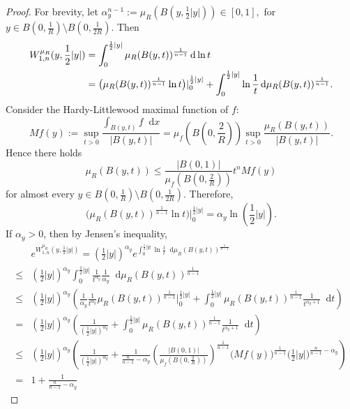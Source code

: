\documentclass[12pt]{amsart}
\theoremstyle{plain}
\theoremstyle{definition}
\theoremstyle{remark}     %
\numberwithin{equation}{section}
\newcommand{\dd}{\mathop{}\!\mathrm{d}}%
\newcommand{\dx}{\mathop{}\!\mathrm{d}x}
\begin{document}
\begin{proof}
    For brevity, let $\alpha_y^{n-1}:=\mu_R(B(y,\frac{1}{2}|y|))\in [0,1],$ for $y\in B(0,\frac{1}{R})\setminus B(0,\frac{1}{2R})$.  Then 
    \begin{align*}
        W_{1,n}^{\mu_R}(y,\frac{1}{2}|y|)
        &=\int_0^{\frac{1}{2}|y|}\mu_R(B(y,t))^{\frac{1}{n-1}}\dd \ln t \\ \notag
       & =\big(\mu_R(B(y,t))^{\frac{1}{n-1}}\ln t\big)|_0^{\frac{1}{2}|y|}
        +\int_0^{\frac{1}{2}|y|}\ln \frac{1}{t}\dd \mu_R(B(y,t))^{\frac{1}{n-1}}.
    \end{align*}
    Consider the Hardy-Littlewood maximal function of $f$:
    \[
        Mf(y):=
        \sup_{t>0}\frac{\int_{B(y,t)}f\dx}{|B(y,t)|}
        =\mu_f(B(0,\frac{2}{R}))\sup_{t>0}\frac{\mu_R(B(y,t))}{|B(y,t)|}.
    \]
    Hence there holds
    \[
        \mu_R(B(y,t))\leq \frac{|B(0,1)|}{\mu_f(B(0,\frac{2}{R}))}t^n Mf(y)
    \]
    for almost every $y \in B(0,\frac{1}{R})\setminus B(0,\frac{1}{2R})$. Therefore,
    \[
        \big(\mu_R(B(y,t))^{\frac{1}{n-1}}\ln t\big)|_0^{\frac{1}{2}|y|}
        =\alpha_y\ln(\frac{1}{2}|y|).
    \]
    If $\alpha_y>0$, then by Jensen's inequality,
    \begin{align*}
        & e^{W_{1,n}^{\mu_R}(y,\frac{1}{2}|y|)}
        =(\frac{1}{2}|y|)^{\alpha_y} 
        e^{\int_0^{\frac{1}{2}|y|} \ln \frac{1}{t}\dd \mu_R(B(y,t))^{\frac{1}{n-1}}
        }\\
        \leq &(\frac{1}{2}|y|)^{\alpha_y} \int_0^{\frac{1}{2}|y|}\frac{1}{t^{\alpha_y}}\frac{1}{\alpha_y}\dd \mu_R(B(y,t))^{\frac{1}{n-1}}\\
        \leq &(\frac{1}{2}|y|)^{\alpha_y}
        \left(
        \frac{1}{\alpha_y}\frac{1}{t^{\alpha_y}}\mu_R(B(y,t))^{\frac{1}{n-1}}\Big|_0^{\frac{1}{2}|y|}
        +\int_0^{\frac{1}{2}|y|}\mu_R(B(y,t))^{\frac{1}{n-1}}\frac{1}{t^{\alpha_y+1}}\dd t
        \right)\\
        =&(\frac{1}{2}|y|)^{\alpha_y}
        \left(
        \frac{1}{(\frac{1}{2}|y|)^{\alpha_y}}
        +\int_0^{\frac{1}{2}|y|}\mu_R(B(y,t))^{\frac{1}{n-1}}\frac{1}{t^{\alpha_y+1}}\dd t
        \right)\\
        \leq &(\frac{1}{2}|y|)^{\alpha_y}
        \left(
        \frac{1}{(\frac{1}{2}|y|)^{\alpha_y}}
        +\frac{1}{\frac{n}{n-1}-\alpha_y}
        \left(\frac{|B(0,1)|}{\mu_f(B(0,\frac{2}{R}))}\right)^{\frac{1}{n-1}}
        \Big(Mf(y)\Big)^{\frac{1}{n-1}}
        \Big(\frac{1}{2}|y|\Big)^{\frac{n}{n-1}-\alpha_y}
        \right)\\
        =&1
        +\frac{1}{\frac{n}{n-1}-\alpha_y}

\end{align*}
\end{proof}
\end{document}
